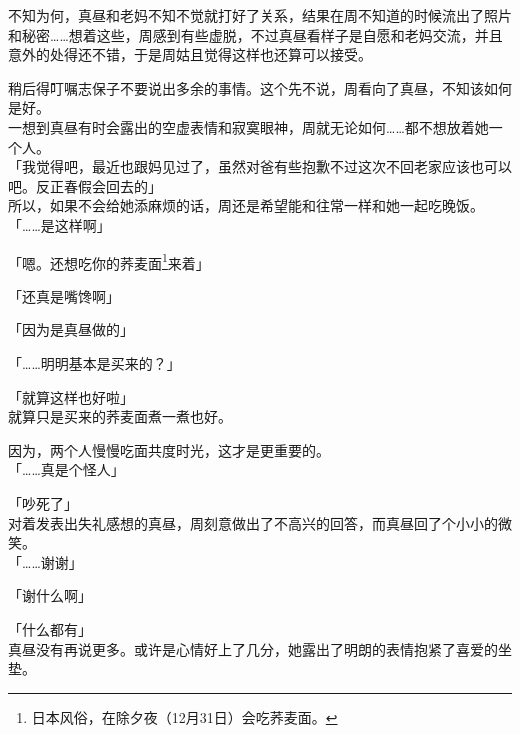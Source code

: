 不知为何，真昼和老妈不知不觉就打好了关系，结果在周不知道的时候流出了照片和秘密……想着这些，周感到有些虚脱，不过真昼看样子是自愿和老妈交流，并且意外的处得还不错，于是周姑且觉得这样也还算可以接受。

稍后得叮嘱志保子不要说出多余的事情。这个先不说，周看向了真昼，不知该如何是好。\\%

一想到真昼有时会露出的空虚表情和寂寞眼神，周就无论如何……都不想放着她一个人。\\

「我觉得吧，最近也跟妈见过了，虽然对爸有些抱歉不过这次不回老家应该也可以吧。反正春假会回去的」\\

所以，如果不会给她添麻烦的话，周还是希望能和往常一样和她一起吃晚饭。\\

「……是这样啊」

「嗯。还想吃你的荞麦面\footnote{日本风俗，在除夕夜（12月31日）会吃荞麦面。}来着」

「还真是嘴馋啊」

「因为是真昼做的」

「……明明基本是买来的？」

「就算这样也好啦」\\

就算只是买来的荞麦面煮一煮也好。

因为，两个人慢慢吃面共度时光，这才是更重要的。\\

「……真是个怪人」

「吵死了」\\

对着发表出失礼感想的真昼，周刻意做出了不高兴的回答，而真昼回了个小小的微笑。\\

「……谢谢」

「谢什么啊」

「什么都有」\\

真昼没有再说更多。或许是心情好上了几分，她露出了明朗的表情抱紧了喜爱的坐垫。
